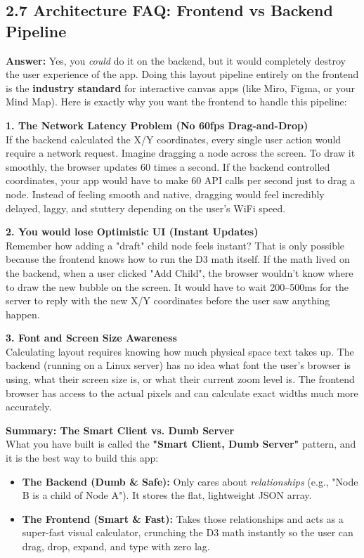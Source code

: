 \documentclass[12pt, a4paper]{article}
\begin{document}
\subsection{2.7 Architecture FAQ: Frontend vs Backend Pipeline}
\begin{tcolorbox}[colback=blue!5!white,colframe=blue!75!black,title=Q: Is this the whole pipeline? Could we just calculate the X/Y positions on the backend and send the final coordinates to React?]

\textbf{Answer:}
Yes, you \textit{could} do it on the backend, but it would completely destroy the user experience of the app. Doing this layout pipeline entirely on the frontend is the \textbf{industry standard} for interactive canvas apps (like Miro, Figma, or your Mind Map). Here is exactly why you want the frontend to handle this pipeline:

\textbf{1. The Network Latency Problem (No 60fps Drag-and-Drop)} \\
If the backend calculated the X/Y coordinates, every single user action would require a network request. Imagine dragging a node across the screen. To draw it smoothly, the browser updates 60 times a second. If the backend controlled coordinates, your app would have to make 60 API calls per second just to drag a node. Instead of feeling smooth and native, dragging would feel incredibly delayed, laggy, and stuttery depending on the user's WiFi speed.

\textbf{2. You would lose Optimistic UI (Instant Updates)} \\
Remember how adding a "draft" child node feels instant? That is only possible because the frontend knows how to run the D3 math itself. If the math lived on the backend, when a user clicked "Add Child", the browser wouldn't know where to draw the new bubble on the screen. It would have to wait 200–500ms for the server to reply with the new X/Y coordinates before the user saw anything happen.

\textbf{3. Font and Screen Size Awareness} \\
Calculating layout requires knowing how much physical space text takes up. The backend (running on a Linux server) has no idea what font the user's browser is using, what their screen size is, or what their current zoom level is. The frontend browser has access to the actual pixels and can calculate exact widths much more accurately.

\textbf{Summary: The Smart Client vs. Dumb Server} \\
What you have built is called the \textbf{"Smart Client, Dumb Server"} pattern, and it is the best way to build this app:
\begin{itemize}
    \item \textbf{The Backend (Dumb \& Safe):} Only cares about \textit{relationships} (e.g., "Node B is a child of Node A"). It stores the flat, lightweight JSON array.
    \item \textbf{The Frontend (Smart \& Fast):} Takes those relationships and acts as a super-fast visual calculator, crunching the D3 math instantly so the user can drag, drop, expand, and type with zero lag.
\end{itemize}
\end{tcolorbox}
\end{document}
